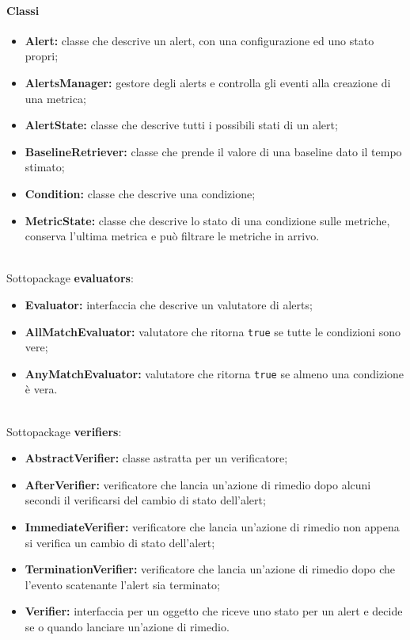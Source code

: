 		\paragraph*{Classi}
			\begin{itemize}
				\item \textbf{Alert:} classe che descrive un alert, con una configurazione ed uno stato propri;
				\item \textbf{AlertsManager:} gestore degli alerts e controlla gli eventi alla creazione di una metrica; 
				\item \textbf{AlertState:} classe che descrive tutti i possibili stati di un alert;
				\item \textbf{BaselineRetriever:} classe che prende il valore di una baseline dato il tempo stimato;
				\item \textbf{Condition:} classe che descrive una condizione;
				\item \textbf{MetricState:} classe che descrive lo stato di una condizione sulle metriche,
					conserva l'ultima metrica e può filtrare le metriche in arrivo.
			\end{itemize}\\
			
			Sottopackage \textbf{evaluators}:
			\begin{itemize}
				\item \textbf{Evaluator:} interfaccia che descrive un valutatore di alerts;
				\item \textbf{AllMatchEvaluator:} valutatore che ritorna \verb=true= se tutte le condizioni 
					sono vere;
				\item \textbf{AnyMatchEvaluator:} valutatore che ritorna \verb=true= se almeno una condizione 
					è vera.
			\end{itemize}\\
				
			Sottopackage \textbf{verifiers}:
			\begin{itemize}
				\item \textbf{AbstractVerifier:} classe astratta per un verificatore;
				\item \textbf{AfterVerifier:} verificatore che lancia un'azione di rimedio dopo
					alcuni secondi il verificarsi del cambio di stato dell'alert;
				\item \textbf{ImmediateVerifier:} verificatore che lancia un'azione di rimedio non
					appena si verifica un cambio di stato dell'alert;
				\item \textbf{TerminationVerifier:} verificatore che lancia un'azione di rimedio 
					dopo che l'evento scatenante l'alert sia terminato;
				\item \textbf{Verifier:} interfaccia per un oggetto che riceve uno stato per un alert
					e decide se o quando lanciare un'azione di rimedio.
			\end{itemize}\\
			
